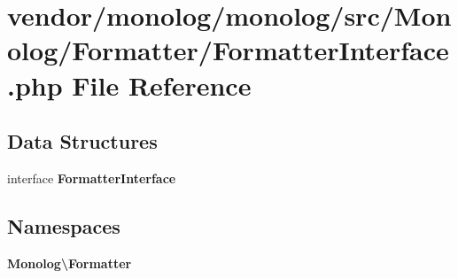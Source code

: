 \section{vendor/monolog/monolog/src/\+Monolog/\+Formatter/\+Formatter\+Interface.php File Reference}
\label{_formatter_interface_8php}
\subsection*{Data Structures}
\begin{DoxyCompactItemize}
\item 
interface {\bf Formatter\+Interface}
\end{DoxyCompactItemize}
\subsection*{Namespaces}
\begin{DoxyCompactItemize}
\item 
 {\bf Monolog\textbackslash{}\+Formatter}
\end{DoxyCompactItemize}
